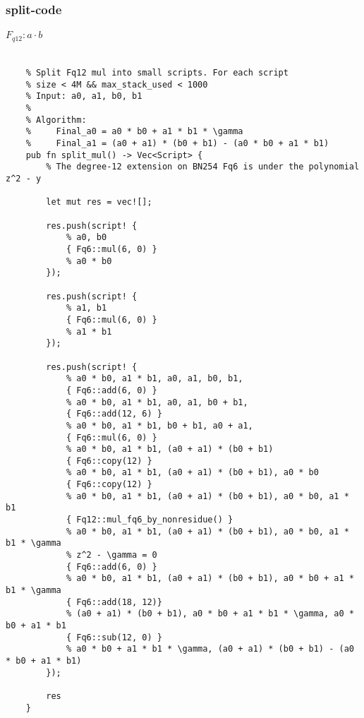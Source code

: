 \subsubsection{split-code}


\paragraph*{$F_{q12} : a \cdot b$}

\begin{lstlisting}

    % Split Fq12 mul into small scripts. For each script
    % size < 4M && max_stack_used < 1000
    % Input: a0, a1, b0, b1
    %
    % Algorithm:
    %     Final_a0 = a0 * b0 + a1 * b1 * \gamma
    %     Final_a1 = (a0 + a1) * (b0 + b1) - (a0 * b0 + a1 * b1)
    pub fn split_mul() -> Vec<Script> {
        % The degree-12 extension on BN254 Fq6 is under the polynomial z^2 - y

        let mut res = vec![];

        res.push(script! {
            % a0, b0
            { Fq6::mul(6, 0) }
            % a0 * b0
        });

        res.push(script! {
            % a1, b1
            { Fq6::mul(6, 0) }
            % a1 * b1
        });

        res.push(script! {
            % a0 * b0, a1 * b1, a0, a1, b0, b1,
            { Fq6::add(6, 0) }
            % a0 * b0, a1 * b1, a0, a1, b0 + b1,
            { Fq6::add(12, 6) }
            % a0 * b0, a1 * b1, b0 + b1, a0 + a1,
            { Fq6::mul(6, 0) }
            % a0 * b0, a1 * b1, (a0 + a1) * (b0 + b1)
            { Fq6::copy(12) }
            % a0 * b0, a1 * b1, (a0 + a1) * (b0 + b1), a0 * b0
            { Fq6::copy(12) }
            % a0 * b0, a1 * b1, (a0 + a1) * (b0 + b1), a0 * b0, a1 * b1
            { Fq12::mul_fq6_by_nonresidue() }
            % a0 * b0, a1 * b1, (a0 + a1) * (b0 + b1), a0 * b0, a1 * b1 * \gamma
            % z^2 - \gamma = 0
            { Fq6::add(6, 0) }
            % a0 * b0, a1 * b1, (a0 + a1) * (b0 + b1), a0 * b0 + a1 * b1 * \gamma
            { Fq6::add(18, 12)}
            % (a0 + a1) * (b0 + b1), a0 * b0 + a1 * b1 * \gamma, a0 * b0 + a1 * b1
            { Fq6::sub(12, 0) }
            % a0 * b0 + a1 * b1 * \gamma, (a0 + a1) * (b0 + b1) - (a0 * b0 + a1 * b1)
        });

        res
    }

\end{lstlisting}

